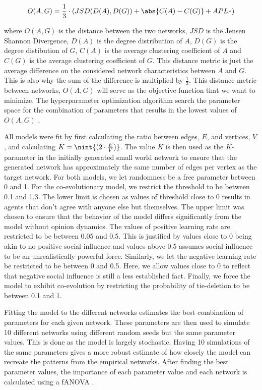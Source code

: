 \documentclass{article}
\DeclarePairedDelimiter{\nint}\lfloor\rceil
\DeclarePairedDelimiter{\abs}\lvert\rvert
\begin{document}
$$ O(A, G) = \frac{1}{3} \cdot \left(JSD(D(A), D(G)) + \abs{C(A) - C(G)} + APL*\right)$$

where $O(A, G)$ is the distance between the two networks, $JSD$ is the Jensen Shannon Divergence, $D(A)$ is the degree distribution of $A$, $D(G)$ is the degree distibution of $G$, $C(A)$ is the average clustering coefficient of $A$ and $C(G)$ is the average clustering coefficient of $G$. This distance metric is just the average difference on the considered network characteristics between $A$ and $G$. This is also why the sum of the difference is multiplied by $\frac{1}{3}$. This distance metric between networks, $O(A, G)$ will serve as the objective function that we want to minimize. The hyperparameter optimization algorithm search the parameter space for the combination of parameters that results in the lowest values of $O(A, G)$ \cite{akiba_optuna_2019,wu_hyperparameter_2019}.

All models were fit by first calculating the ratio between edges, $E$, and vertices, $V$, and calculating $K = \nint{(2 \cdot \frac{E}{V})}$. The value $K$ is then used as the $K$-parameter in the initially generated small world network to ensure that the generated network has approximately the same number of edges per vertex as the target network. 
For both models, we let randomness be a free parameter between 0 and 1. For the co-evolutionary model, we restrict the threshold to be between 0.1 and 1.3. The lower limit is chosen as values of threshold close to 0 results in agents that don’t agree with anyone else but themselves. The upper limit was chosen to ensure that the behavior of the model differs significantly from the model without opinion dynamics. 
The values of positive learning rate are restricted to be between 0.05 and 0.5. This is justified by values close to 0 being akin to no positive social influence and values above 0.5 assumes social influence to be an unrealistically powerful force. Similarly, we let the negative learning rate be restricted to be between 0 and 0.5. Here, we allow values close to 0 to reflect that negative social influence is still a less established fact. Finally, we force the model to exhibit co-evolution by restricting the probability of tie-deletion to be between 0.1 and 1. 

Fitting the model to the different networks estimates the best combination of parameters for each given network. These parameters are then used to simulate 10 different networks using different random seeds but the same parameter values. This is done as the model is largely stochastic. Having 10 simulations of the same parameters gives a more robust estimate of how closely the model can recreate the patterns from the empirical networks.
After finding the best parameter values, the importance of each parameter value and each network is calculated using a fANOVA \cite{hutter2014efficient}. 
\end{document}
